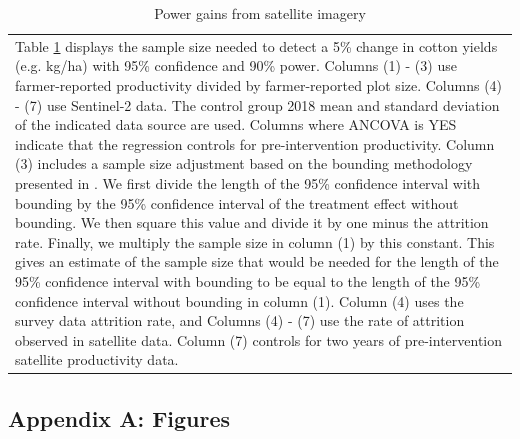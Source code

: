 \documentclass{article}
\begin{document}
\pagebreak
\clearpage

\FloatBarrier

\begin{table}[!ht] \centering \caption{Power gains from satellite imagery} \label{t:power}

\begin{tabularx}{0.8\linewidth}{@{}X@{}}
\footnotesize Table \ref{t:power} displays the sample size needed to detect a 5\% change in cotton yields (e.g. kg/ha) with 95\% confidence and 90\% power. Columns (1) - (3) use farmer-reported productivity divided by farmer-reported plot size. Columns (4) - (7) use Sentinel-2 data. The control group 2018 mean and standard deviation of the indicated data source are used. Columns where ANCOVA is YES indicate that the regression controls for pre-intervention productivity. Column (3) includes a sample size adjustment based on the bounding methodology presented in \citet{Lee2009TrainingEffects}. We first divide the length of the 95\% confidence interval with bounding by the 95\% confidence interval of the treatment effect without bounding. We then square this value and divide it by one minus the attrition rate. Finally, we multiply the sample size in column (1) by this constant. This gives an estimate of the sample size that would be needed for the length of the 95\% confidence interval with bounding to be equal to the length of the 95\% confidence interval without bounding in column (1). Column (4) uses the survey data attrition rate, and Columns (4) - (7) use the rate of attrition observed in satellite data. Column (7) controls for two years of pre-intervention satellite productivity data. 
\end{tabularx}
\end{table}

\FloatBarrier

\pagebreak
\clearpage

\begin{center}
\section*{Appendix A: Figures}
\end{center}

\setcounter{figure}{0}
\renewcommand{\figurename}{}\renewcommand{\thefigure}{Appendix Figure \arabic{figure}}
\end{document}
